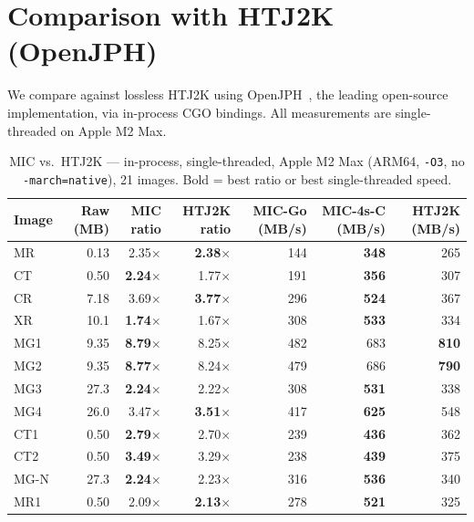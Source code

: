 \documentclass[10pt,twocolumn]{article}
\begin{document}
\section{Comparison with HTJ2K (OpenJPH)}
\label{sec:htj2k}

We compare against lossless HTJ2K using OpenJPH~\cite{openjph}, the leading open-source implementation, via in-process CGO bindings. All measurements are single-threaded on Apple M2 Max.

\begin{table}[t]
  \centering
  \caption{MIC vs.\ HTJ2K --- in-process, single-threaded, Apple M2 Max (ARM64, \texttt{-O3}, no \texttt{-march=native}), 21 images. Bold = best ratio or best single-threaded speed.}
  \label{tab:htj2k}
  \small
  \setlength{\tabcolsep}{4pt}
  \begin{tabular}{lrrrrrr}
    \toprule
    Image & Raw (MB) & MIC ratio & HTJ2K ratio & MIC-Go (MB/s) & MIC-4s-C (MB/s) & HTJ2K (MB/s) \\
    \midrule
    MR  & 0.13 & 2.35$\times$ & \textbf{2.38$\times$} & 144 & \textbf{348} & 265 \\
    CT  & 0.50 & \textbf{2.24$\times$} & 1.77$\times$ & 191 & \textbf{356} & 307 \\
    CR  & 7.18 & 3.69$\times$ & \textbf{3.77$\times$} & 296 & \textbf{524} & 367 \\
    XR  & 10.1 & \textbf{1.74$\times$} & 1.67$\times$ & 308 & \textbf{533} & 334 \\
    MG1 & 9.35 & \textbf{8.79$\times$} & 8.25$\times$ & 482 & 683 & \textbf{810} \\
    MG2 & 9.35 & \textbf{8.77$\times$} & 8.24$\times$ & 479 & 686 & \textbf{790} \\
    MG3 & 27.3 & \textbf{2.24$\times$} & 2.22$\times$ & 308 & \textbf{531} & 338 \\
    MG4 & 26.0 & 3.47$\times$ & \textbf{3.51$\times$} & 417 & \textbf{625} & 548 \\
    CT1 & 0.50 & \textbf{2.79$\times$} & 2.70$\times$ & 239 & \textbf{436} & 362 \\
    CT2 & 0.50 & \textbf{3.49$\times$} & 3.29$\times$ & 238 & \textbf{439} & 375 \\
    MG-N & 27.3 & \textbf{2.24$\times$} & 2.23$\times$ & 316 & \textbf{536} & 340 \\
    MR1 & 0.50 & 2.09$\times$ & \textbf{2.13$\times$} & 278 & \textbf{521} & 325 \\

\end{tabular}
\end{table}
\end{document}
